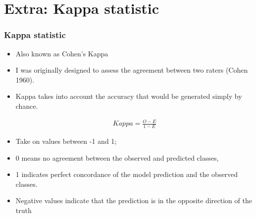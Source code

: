 \documentclass[
  shownotes,
  xcolor={svgnames},
  hyperref={colorlinks,citecolor=DarkBlue,linkcolor=andesred,urlcolor=DarkBlue}
  , aspectratio=169]{beamer}
\begin{document}
\section{Extra: Kappa statistic}
\begin{frame}[fragile]
\frametitle{Kappa statistic}

\begin{itemize}
  \item Also known as Cohen’s Kappa 
  \item I was originally designed to assess the agreement between two raters (Cohen 1960). 
  \item Kappa takes into account the accuracy that would be generated simply by chance. 


\begin{align}
Kappa = \frac{O - E}{1-E} 
\end{align}

\item Take on values between -1 and 1; 
\item 0 means  no agreement between the observed and predicted classes, 
\item 1 indicates perfect concordance of the model prediction and the observed classes. 
\item Negative values indicate that the prediction is in the opposite direction of the truth
\end{itemize}
\end{frame}
\end{document}
